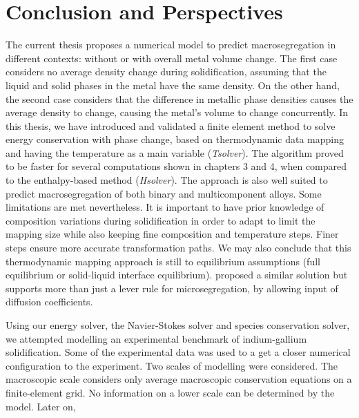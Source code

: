 \chapter*{Conclusion and Perspectives}


The current thesis proposes a numerical model to predict macrosegregation in different contexts: without or
with overall metal volume change. The first case considers no average density change during solidification, 
assuming that the liquid and solid phases in the metal have the same density. 
On the other hand, the second case considers that the difference in metallic phase densities causes the average density to change, causing the metal's volume to
change concurrently. 
In this thesis, we have introduced and validated a finite element method to solve energy conservation with phase change, based 
on thermodynamic data mapping and having the temperature as a main variable (\emph{Tsolver}). The algorithm proved to be faster for several computations
shown in chapters 3 and 4, when compared to the enthalpy-based method (\emph{Hsolver}). The approach is also well suited to predict macrosegregation
of both binary and multicomponent alloys. Some limitations are met nevertheless. It is important to have prior knowledge of composition variations
during solidification in order to adapt to limit the mapping size while also keeping fine composition and temperature steps.
Finer steps ensure more accurate transformation paths. We may also conclude that this thermodynamic mapping approach is still
to equilibrium assumptions (full equilibrium or solid-liquid interface equilibrium). \citet{tourret_multiple_2011} proposed
a similar solution but supports more than just a lever rule for microsegregation, by allowing input of diffusion coefficients.

Using our energy solver, the Navier-Stokes solver and species conservation solver, we attempted modelling an experimental benchmark 
of indium-gallium solidification. Some of the experimental data was used to a get a closer numerical configuration to the experiment.
Two scales of modelling were considered. The macroscopic scale considers only average macroscopic conservation equations on a 
finite-element grid. No information on a lower scale can be determined by the model.
Later on,  


